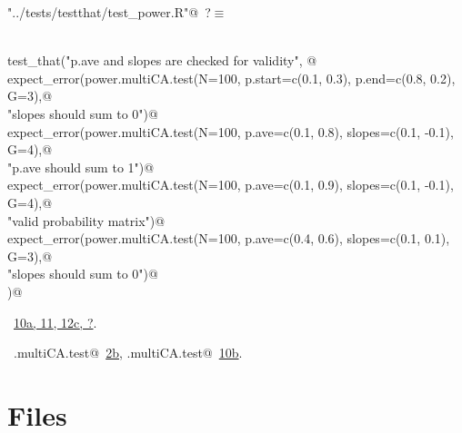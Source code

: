 \documentclass[reqno]{amsart}
\renewcommand{\NWtarget}[2]{\hypertarget{#1}{#2}}
\renewcommand{\NWlink}[2]{\hyperlink{#1}{#2}}
\begin{document}
\begin{flushleft} \small\label{scrap22}\raggedright\small
\NWtarget{nuweb?}{} \verb@"../tests/testthat/test_power.R"@\nobreak\ {\footnotesize {?}}$\equiv$
\vspace{-1ex}
\begin{list}{}{} \item
\mbox{}\verb@@\\
\mbox{}\verb@  test_that("p.ave and slopes are checked for validity", {@\\
\mbox{}\verb@    expect_error(power.multiCA.test(N=100, p.start=c(0.1, 0.3), p.end=c(0.8, 0.2), G=3),@\\
\mbox{}\verb@                "slopes should sum to 0")@\\
\mbox{}\verb@    expect_error(power.multiCA.test(N=100, p.ave=c(0.1, 0.8), slopes=c(0.1, -0.1), G=4),@\\
\mbox{}\verb@                  "p.ave should sum to 1")@\\
\mbox{}\verb@    expect_error(power.multiCA.test(N=100, p.ave=c(0.1, 0.9), slopes=c(0.1, -0.1), G=4),@\\
\mbox{}\verb@                  "valid probability matrix")@\\
\mbox{}\verb@    expect_error(power.multiCA.test(N=100, p.ave=c(0.4, 0.6), slopes=c(0.1, 0.1), G=3),@\\
\mbox{}\verb@                "slopes should sum to 0")@\\
\mbox{}\verb@  })@\\
\mbox{}\verb@@{\NWsep}
\end{list}
\vspace{-1.5ex}
\footnotesize
\begin{list}{}{\setlength{\itemsep}{-\parsep}\setlength{\itemindent}{-\leftmargin}}
\item \NWtxtFileDefBy\ \NWlink{nuweb10a}{10a}\NWlink{nuweb11}{, 11}\NWlink{nuweb12c}{, 12c}\NWlink{nuweb?}{, ?}.
\item \NWtxtIdentsUsed\nobreak\  \verb@.multiCA.test@\nobreak\ \NWlink{nuweb2b}{2b}, \verb@power.multiCA.test@\nobreak\ \NWlink{nuweb10b}{10b}.
\item{}
\end{list}
\vspace{4ex}
\end{flushleft}
\section{Files}
\end{document}
